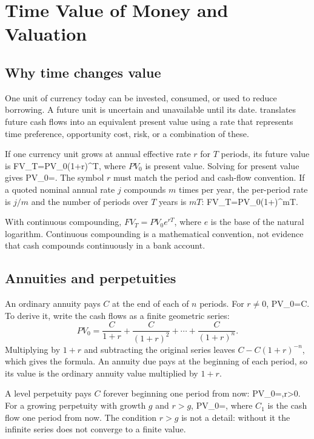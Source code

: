 \chapter{Time Value of Money and Valuation}

\section{Why time changes value}
One unit of currency today can be invested, consumed, or used to reduce borrowing. A future unit is uncertain and unavailable until its date.  translates future cash flows into an equivalent present value using a rate that represents time preference, opportunity cost, risk, or a combination of these.

If one currency unit grows at annual effective rate $r$ for $T$ periods, its future value is
  FV_T=PV_0(1+r)^T,
\closeformula
where $PV_0$ is present value. Solving for present value gives
  PV_0=.
\closeformula
The symbol $r$ must match the period and cash-flow convention. If a quoted nominal annual rate $j$ compounds $m$ times per year, the per-period rate is $j/m$ and the number of periods over $T$ years is $mT$:
  FV_T=PV_0\left(1+\right)^{mT}.
\closeformula

With continuous compounding, $FV_T=PV_0e^{rT}$, where $e$ is the base of the natural logarithm. Continuous compounding is a mathematical convention, not evidence that cash compounds continuously in a bank account.

\section{Annuities and perpetuities}
An ordinary annuity pays $C$ at the end of each of $n$ periods. For $r\ne0$,
  PV_0=C.
\closeformula
To derive it, write the cash flows as a finite geometric series:
\[PV_0=\frac{C}{1+r}+\frac{C}{(1+r)^2}+\cdots+\frac{C}{(1+r)^n}.\]
Multiplying by $1+r$ and subtracting the original series leaves $C-C(1+r)^{-n}$, which gives the formula. An annuity due pays at the beginning of each period, so its value is the ordinary annuity value multiplied by $1+r$.

A level perpetuity pays $C$ forever beginning one period from now:
  PV_0=,\qquad r>0.
\closeformula
For a growing perpetuity with growth $g$ and $r>g$,
  PV_0=,
\closeformula
where $C_1$ is the cash flow one period from now. The condition $r>g$ is not a detail: without it the infinite series does not converge to a finite value.

